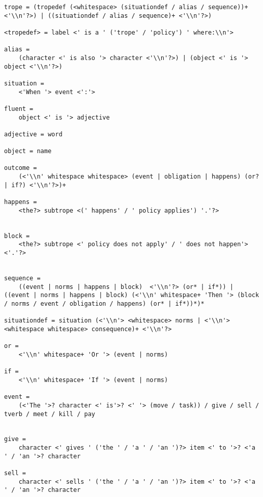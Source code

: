 \begin{lstlisting}
trope = (tropedef (<whitespace> (situationdef / alias / sequence))+ <'\\n'?>) | ((situationdef / alias / sequence)+ <'\\n'?>)

<tropedef> = label <' is a ' ('trope' / 'policy') ' where:\\n'>

alias =
    (character <' is also '> character <'\\n'?>) | (object <' is '> object <'\\n'?>)

situation =
    <'When '> event <':'>

fluent =
    object <' is '> adjective

adjective = word

object = name

outcome =
    (<'\\n' whitespace whitespace> (event | obligation | happens) (or? | if?) <'\\n'?>)+

happens =
    <the?> subtrope <(' happens' / ' policy applies') '.'?>


block =
    <the?> subtrope <' policy does not apply' / ' does not happen'> <'.'?>


sequence =
    ((event | norms | happens | block)  <'\\n'?> (or* | if*)) | ((event | norms | happens | block) (<'\\n' whitespace+ 'Then '> (block / norms / event / obligation / happens) (or* | if*))*)*

situationdef = situation (<'\\n'> <whitespace> norms | <'\\n'> <whitespace whitespace> consequence)+ <'\\n'?>

or =
    <'\\n' whitespace+ 'Or '> (event | norms)

if =
    <'\\n' whitespace+ 'If '> (event | norms)

event =
    (<'The '>? character <' is'>? <' '> (move / task)) / give / sell / tverb / meet / kill / pay


give =
    character <' gives ' ('the ' / 'a ' / 'an ')?> item <' to '>? <'a ' / 'an '>? character

sell =
    character <' sells ' ('the ' / 'a ' / 'an ')?> item <' to '>? <'a ' / 'an '>? character


\end{lstlisting}
